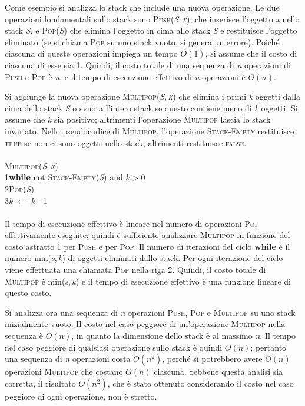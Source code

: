 \documentclass[10pt, a4paper]{report}
\newcommand\firsttab[1][0.5cm]{\hspace*{#1}}
\newcommand\secondtab[1][1cm]{\hspace*{#1}}
\begin{document}
Come esempio si analizza lo stack che include una nuova operazione. Le due operazioni fondamentali sullo stack sono \textsc{Push(\textit{S},\,\textit{x})}, che inserisce l'oggetto \textit{x} nello stack \textit{S}, e \textsc{Pop(\textit{S})} che elimina l'oggetto in cima allo stack \textit{S} e restituisce l'oggetto eliminato (se si chiama \textsc{Pop} su uno stack vuoto, si genera un errore). Poiché ciascuna di queste operazioni impiega un tempo $O(1)$, si assume che il costo di ciascuna di esse sia 1. Quindi, il costo totale di una sequenza di \textit{n} operazioni di \textsc{Push} e \textsc{Pop} è \textit{n}, e il tempo di esecuzione effettivo di \textit{n} operazioni è $\Theta(n)$.

Si aggiunge la nuova operazione \textsc{Multipop(\textit{S},\,\textit{k})} che elimina i primi \textit{k} oggetti dalla cima dello stack \textit{S} o svuota l'intero stack se questo contiene meno di \textit{k} oggetti. Si assume che \textit{k} sia positivo; altrimenti l'operazione \textsc{Multipop} lascia lo stack invariato. Nello pseudocodice di \textsc{Multipop}, l'operazione \textsc{Stack-Empty} restituisce \textsc{true} se non ci sono oggetti nello stack, altrimenti restituisce \textsc{false}.\\\\
\textsc{Multipop(\textit{S},\,\textit{k})}\\
1\firsttab\textbf{while} not \textsc{Stack-Empty(\textit{S})} and $k > 0$\\
2\secondtab\textsc{Pop(\textit{S})}\\
3\secondtab\textit{k} $\leftarrow$ \textit{k} - 1\\\\
Il tempo di esecuzione effettivo è lineare nel numero di operazioni \textsc{Pop} effettivamente eseguite; quindi è sufficiente analizzare \textsc{Multipop} in funzione del costo astratto 1 per \textsc{Push} e per \textsc{Pop}. Il numero di iterazioni del ciclo \textbf{while} è il numero min(\textit{s},\,\textit{k}) di oggetti eliminati dallo stack. Per ogni iterazione del ciclo viene effettuata una chiamata \textsc{Pop} nella riga 2. Quindi, il costo totale di \textsc{Multipop} è min(\textit{s},\,\textit{k}) e il tempo di esecuzione effettivo è una funzione lineare di questo costo.

Si analizza ora una sequenza di \textit{n} operazioni \textsc{Push}, \textsc{Pop} e \textsc{Multipop} su uno stack inizialmente vuoto. Il costo nel caso peggiore di un'operazione \textsc{Multipop} nella sequenza è $O(n)$, in quanto la dimensione dello stack è al massimo \textit{n}. Il tempo nel caso peggiore di qualsiasi operazione sullo stack è quindi $O(n)$; pertanto una sequenza di \textit{n} operazioni costa $O(n^2)$, perché si potrebbero avere $O(n)$ operazioni \textsc{Multipop} che costano $O(n)$ ciascuna. Sebbene questa analisi sia corretta, il risultato $O(n^2)$, che è stato ottenuto considerando il costo nel caso peggiore di ogni operazione, non è stretto.
\end{document}
